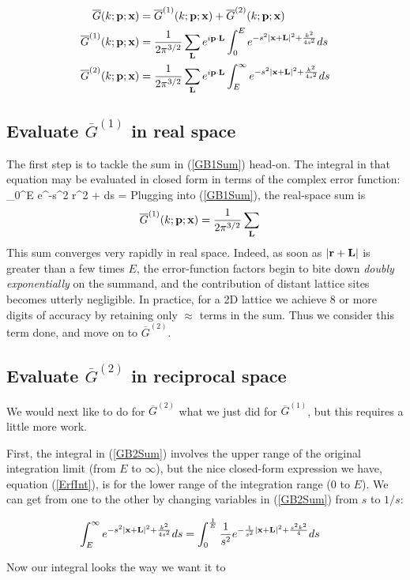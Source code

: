 \documentclass[letterpaper]{article}
\newcommand{\GB}{\overline{G}}
\begin{document}
\begin{align}
\GB(k; \vb p; \vb x) 
 &= \GB^{(1)}(k; \vb p; \vb x) 
   +\GB^{(2)}(k; \vb p; \vb x) 
\label{GBDecomposition}
\\
\GB^{(1)}(k; \vb p; \vb x) 
&= \frac{1}{2\pi^{3/2}}
   \sum_{\vb L} e^{i\vb p \cdot \vb L} \int_0^E e^{-s^2 |\vb x+\vb L|^2 + \frac{k^2}{4s^2}} ds
\label{GB1Sum}
\\
\GB^{(2)}(k; \vb p; \vb x) 
&= \frac{1}{2\pi^{3/2}}
   \sum_{\vb L} e^{i\vb p \cdot \vb L} \int_E^\infty e^{-s^2 |\vb x + \vb L|^2 + \frac{k^2}{4s^2}} ds
\label{GB2Sum}
\end{align}

\subsection*{Evaluate $\GB^{(1)}$ in real space} 

The first step is to tackle the sum in (\ref{GB1Sum}) head-on. 
The integral in that equation may be evaluated in closed form in terms of
the complex error function:
{
   \int_0^E e^{-s^2 r^2 + } ds
   = 
}
Plugging into (\ref{GB1Sum}), the real-space sum is 
\begin{align*}
\GB^{(1)}(k; \vb p; \vb x) 
&= \frac{1}{2\pi^{3/2}}
   \sum_{\vb L}
\end{align*}
This sum converges very rapidly in real space. Indeed, as soon as 
$|\mathbf{r} + \mathbf{L}|$ is greater than a few times $E$, the error-function
factors begin to bite down \textit{doubly exponentially} on the
summand, and the contribution of distant lattice sites becomes 
utterly negligible. In practice, for a 2D lattice we achieve 8 
or more digits of accuracy by retaining only $\approx$ terms in the sum.
Thus we consider this term done, and move on to $\GB^{(2)}.$ 

\subsection*{Evaluate $\GB^{(2)}$ in reciprocal space} 

We would next like to do for $\GB^{(2)}$ what we just did for $\GB^{(1)}$,
but this requires a little more work. 

First, the integral in (\ref{GB2Sum}) involves the upper range of the 
original integration limit (from $E$ to $\infty$), but the nice closed-form 
expression we have, equation (\ref{ErfInt}), is for the lower range 
of the integration range (0 to $E$). We can get from one to the other 
by changing variables in (\ref{GB2Sum}) from $s$ to $1/s$: 

\begin{align*}
\int_E^\infty e^{-s^2 |\mathbf{x} + \mathbf{L}|^2 + \frac{k^2}{4s^2}} ds
&= \int_0^\frac{1}{E} \frac{1}{s^2} e^{-\frac{1}{s^2} |\mathbf{x} + \mathbf{L}|^2 + \frac{s^2 k^2}{4}} ds
\label{GB2Sum2}
\end{align*}

Now our integral looks the way we want it to
\end{document}
